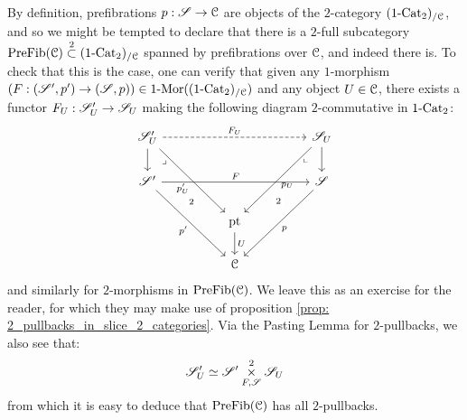             \begin{remark}
                By definition, prefibrations $p: \mathscr{S} \to \mathcal{C}$ are objects of the $2$-category $(1\text{-}\mathrm{Cat}_2)_{/\mathcal{C}}$, and so we might be tempted to declare that there is a $2$-full subcategory $\mathrm{Pre}\mathrm{Fib}(\mathcal{C}) \overset{2}{\subset} (1\text{-}\mathrm{Cat}_2)_{/\mathcal{C}}$ spanned by prefibrations over $\mathcal{C}$, and indeed there is. To check that this is the case, one can verify that given any $1$-morphism $(F: (\mathscr{S}', p') \to (\mathscr{S}, p)) \in 1\text{-}\mathrm{Mor}((1\text{-}\mathrm{Cat}_2)_{/\mathcal{C}})$ and any object $U \in \mathcal{C}$, there exists a functor $F_U: \mathscr{S}'_U \to \mathscr{S}_U$ making the following diagram $2$-commutative in $1\text{-}\mathrm{Cat}_2$:
                    $$
                        \begin{tikzcd}
                        	{\scrS'_U} &&&& {\scrS_U} \\
                        	{\scrS'} &&&& \scrS \\
                        	&& \pt \\
                        	&& \C
                        	\arrow["{p'}"', from=2-1, to=4-3]
                        	\arrow["U", from=3-3, to=4-3]
                        	\arrow["{p'_U}"', from=1-1, to=3-3]
                        	\arrow["\lrcorner"{anchor=center, pos=0.125}, draw=none, from=1-1, to=4-3, "2"{description}]
                        	\arrow[from=1-1, to=2-1]
                        	\arrow["{p_U}", from=1-5, to=3-3]
                        	\arrow[from=1-5, to=2-5]
                        	\arrow["p", from=2-5, to=4-3]
                        	\arrow["F", from=2-1, to=2-5]
                        	\arrow["{F_U}", from=1-1, to=1-5, dashed]
                        	\arrow["\lrcorner"{anchor=center, pos=0.125, rotate=-90}, draw=none, from=1-5, to=4-3, "2"{description}]
                        \end{tikzcd}
                    $$
                and similarly for $2$-morphisms in $\mathrm{Pre}\mathrm{Fib}(\mathcal{C})$. We leave this as an exercise for the reader, for which they may make use of proposition \ref{prop: 2_pullbacks_in_slice_2_categories}. Via the Pasting Lemma for $2$-pullbacks, we also see that:
                    $$\scrS'_U \cong \scrS' \x^2_{F, \scrS} \scrS_U$$
                from which it is easy to deduce that $\mathrm{Pre}\mathrm{Fib}(\mathcal{C})$ has all $2$-pullbacks.
            \end{remark}
        
